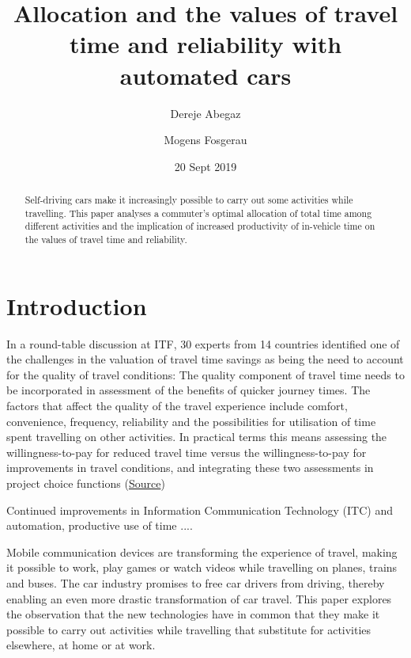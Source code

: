 \documentclass[12pt,a4paper,british]{article}
\begin{document}
\title{Allocation and the values of travel time and reliability with automated cars}

\author{Dereje Abegaz \and Mogens Fosgerau}

\date{20 Sept 2019}

\maketitle

\begin{abstract}
Self-driving cars make it increasingly possible to carry out some activities while travelling. This paper analyses a commuter's optimal allocation of total time among different activities and the implication of increased productivity of in-vehicle time on the values of travel time and reliability.
\end{abstract}

\section{Introduction}
\label{sec:introduction}


In a round-table discussion at ITF, 30 experts from 14 countries identified one of the challenges in the valuation of travel time savings as being the need to account for the quality of travel conditions: The quality component of travel time needs to be incorporated in assessment of the benefits of quicker journey times. The factors that affect the quality of the travel experience include comfort, convenience, frequency, reliability and the possibilities for utilisation of time spent travelling on other activities. In practical terms this means assessing the willingness-to-pay for reduced travel time versus the willingness-to-pay for improvements in travel conditions, and integrating these two assessments in project choice functions (\href{https://www.itf-oecd.org/sites/default/files/docs/value-saving-travel-time.pdf}{Source})

Continued improvements in Information Communication Technology (ITC) and automation, productive use of time .... 

Mobile communication devices are transforming the experience of travel, making it possible to work, play games or watch videos while travelling on planes, trains and buses. The car industry promises to free car drivers from driving, thereby enabling an even more drastic transformation of car travel. This paper explores the observation that the new technologies have in common that they make it possible to carry out activities while travelling that substitute for activities elsewhere, at home or at work.
\end{document}
